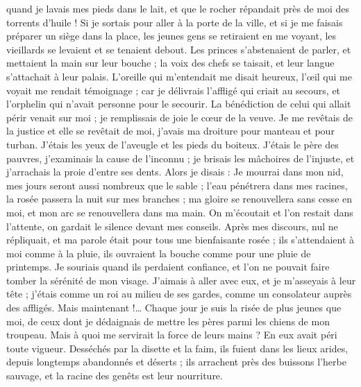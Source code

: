 \begin{multicols}{2}
quand je lavais mes pieds dans le lait, et que le rocher répandait près de moi des torrents d'huile !
Si je sortais pour aller à la porte de la ville, et si je me faisais préparer un siège dans la place,
les jeunes gens se retiraient en me voyant, les vieillards se levaient et se tenaient debout.
Les princes s'abstenaient de parler, et mettaient la main sur leur bouche ;
la voix des chefs se taisait, et leur langue s'attachait à leur palais.
L'oreille qui m'entendait me disait heureux, l'œil qui me voyait me rendait témoignage ;
car je délivrais l'affligé qui criait au secours, et l'orphelin qui n'avait personne pour le secourir.
La bénédiction de celui qui allait périr venait sur moi ; je remplissais de joie le cœur de la veuve.
Je me revêtais de la justice et elle se revêtait de moi, j'avais ma droiture pour manteau et pour turban.
J'étais les yeux de l'aveugle et les pieds du boiteux.
J'étais le père des pauvres, j'examinais la cause de l'inconnu ;
je brisais les mâchoires de l'injuste, et j'arrachais la proie d'entre ses dents.
Alors je disais : Je mourrai dans mon nid, mes jours seront aussi nombreux que le sable ;
l'eau pénétrera dans mes racines, la rosée passera la nuit sur mes branches ;
ma gloire se renouvellera sans cesse en moi, et mon arc se renouvellera dans ma main.
On m'écoutait et l'on restait dans l'attente, on gardait le silence devant mes conseils.
Après mes discours, nul ne répliquait, et ma parole était pour tous une bienfaisante rosée ;
ils s'attendaient à moi comme à la pluie, ils ouvraient la bouche comme pour une pluie de printemps.
Je souriais quand ils perdaient confiance, et l'on ne pouvait faire tomber la sérénité de mon visage.
J'aimais à aller avec eux, et je m'asseyais à leur tête ; j'étais comme un roi au milieu de ses gardes, comme un consolateur auprès des affligés.
\VerseOne{}Mais maintenant !… Chaque jour je suis la risée de plus jeunes que moi, de ceux dont je dédaignais de mettre les pères parmi les chiens de mon troupeau.
Mais à quoi me servirait la force de leurs mains ? En eux avait péri toute vigueur.
Desséchés par la disette et la faim, ils fuient dans les lieux arides, depuis longtemps abandonnés et déserts ;
ils arrachent près des buissons l'herbe sauvage, et la racine des genêts est leur nourriture.

\end{multicols}
